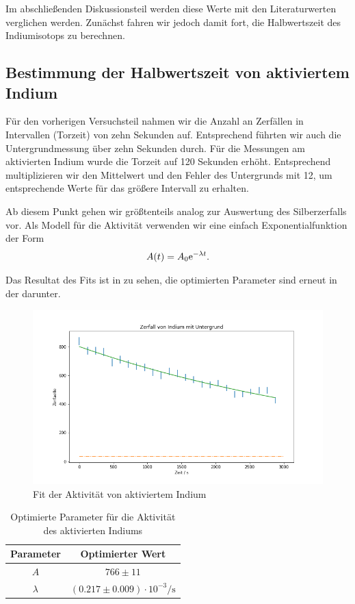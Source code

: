 Im abschließenden Diskussionsteil werden diese Werte mit den Literaturwerten verglichen werden. Zunächst fahren wir jedoch damit fort, die Halbwertszeit des Indiumisotops zu berechnen.

\subsection{Bestimmung der Halbwertszeit von aktiviertem Indium}

Für den vorherigen Versuchsteil nahmen wir die Anzahl an Zerfällen in Intervallen (Torzeit) von zehn Sekunden auf. Entsprechend führten wir auch die Untergrundmessung über zehn Sekunden durch. Für die Messungen am aktivierten Indium wurde die Torzeit auf 120 Sekunden erhöht. Entsprechend multiplizieren wir den Mittelwert und den Fehler des Untergrunds mit 12, um entsprechende Werte für das größere Intervall zu erhalten.

Ab diesem Punkt gehen wir größtenteils analog zur Auswertung des Silberzerfalls vor. Als Modell für die Aktivität verwenden wir eine einfach Exponentialfunktion der Form
\begin{align}
    A(t) = A_0 \text{e}^{-\lambda t}.
\end{align}

Das Resultat des Fits ist in  zu sehen, die optimierten Parameter sind erneut in der  darunter.

\begin{figure}[H]
    \centering
    \includegraphics[width=.9\textwidth]{files/indium.png}
    \caption{Fit der Aktivität von aktiviertem Indium}
    \label{plot:fit_indium}
\end{figure}

\begin{table}[H]
    \centering
    \begin{tabular}{c|c}
        Parameter & Optimierter Wert\\\hline
        $A$ & $766 \pm 11$\\
        $\lambda$ & $(0.217 \pm 0.009) \cdot 10^{-3} \si{\per\second}$
    \end{tabular}
    \caption{Optimierte Parameter für die Aktivität des aktivierten Indiums}
    \label{tab:fit_indium_fitted}
\end{table}

